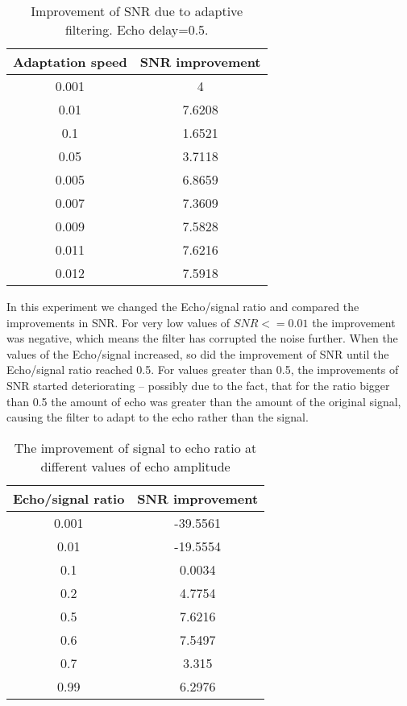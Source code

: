\documentclass{article}
\begin{document}
\newpage
\begin{table}[ht!]
  \begin{center}
      \caption{Improvement of SNR due to adaptive filtering. Echo delay=0.5.}
    \label{tab:task21tab}
    \begin{tabular}{c|c} 
      \textbf{Adaptation speed} & \textbf{SNR improvement} \\
      \hline
        0.001 & 4 \\
        0.01 & 7.6208 \\
        0.1 & 1.6521 \\
        0.05 & 3.7118 \\
        0.005 & 6.8659 \\
        0.007 & 7.3609 \\
        0.009 & 7.5828 \\
        0.011 & 7.6216 \\
        0.012 & 7.5918 \\
    \end{tabular}
  \end{center}
\end{table}

In this experiment we changed the Echo/signal ratio and compared the
improvements in SNR. For very low values of $SNR <= 0.01$ the improvement was
negative, which means the filter has corrupted the noise further. When the
values of the Echo/signal increased, so did the improvement of SNR until the
Echo/signal ratio reached 0.5. For values greater than 0.5, the improvements of
SNR started deteriorating – possibly due to the fact, that for the ratio bigger
than 0.5 the amount of echo was greater than the amount of the original signal,
causing the filter to adapt to the echo rather than the signal. 

\begin{table}[ht!]
  \begin{center}
    \caption{The improvement of signal to echo ratio at different values of echo amplitude}
        \label{tab:task4tab}
        \begin{tabular}{c|c} 
        \textbf{Echo/signal ratio} & \textbf{SNR improvement} \\ \hline
            0.001 & -39.5561 \\
            0.01 & -19.5554 \\
            0.1 & 0.0034 \\
            0.2 & 4.7754 \\
            0.5 & 7.6216 \\
            0.6 & 7.5497 \\
            0.7 & 3.315 \\
            0.99 & 6.2976 \\
    \end{tabular}
  \end{center}
\end{table}
\end{document}
